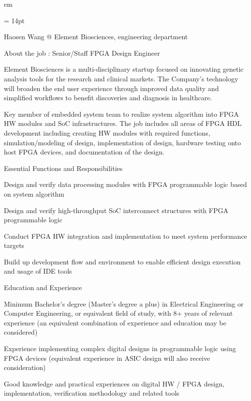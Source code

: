 

 em

\FFrf \baselineskip = 14pt



\centerline{
Haosen Wang @ Element Biosciences, engineering department
} 

\par About the job : Senior/Staff FPGA Design Engineer
\par Element Biosciences is a multi-disciplinary startup focused on innovating genetic analysis tools for the research and clinical markets. The Company's technology will broaden the end user experience through improved data quality and simplified workflows to benefit discoveries and diagnosis in healthcare.
\par Key member of embedded system team to realize system algorithm into FPGA HW modules and SoC infrastructures. The job includes all areas of FPGA HDL development including creating HW modules with required functions, simulation/modeling of design, implementation of design, hardware testing onto host FPGA devices, and documentation of the design. 
\par Essential Functions and Responsibilities
\par Design and verify data processing modules with FPGA programmable logic based on system algorithm
\par Design and verify high-throughput SoC interconnect structures with FPGA programmable logic
\par Conduct FPGA HW integration and implementation to meet system performance targets
\par Build up development flow and environment to enable efficient design execution and usage of IDE tools
\par Education and Experience
\par Minimum Bachelor’s degree (Master's degree a plus) in Electrical Engineering or Computer Engineering, or equivalent field of study, with 8+ years of relevant experience (an equivalent combination of experience and education may be considered)
\par Experience implementing complex digital designs in programmable logic using FPGA devices (equivalent experience in ASIC design will also receive consideration)
\par Good knowledge and practical experiences on digital HW / FPGA design, implementation, verification methodology and related tools

